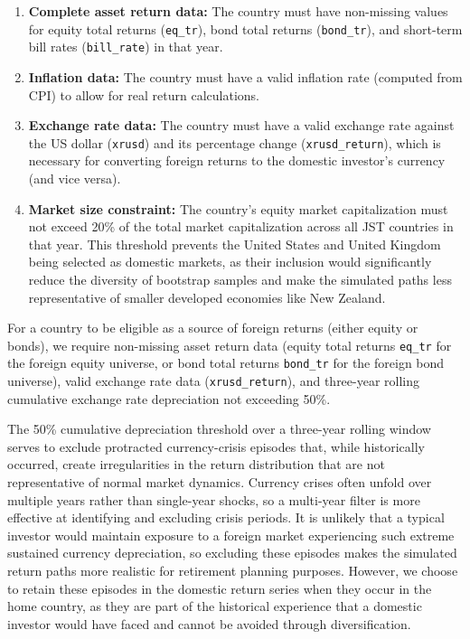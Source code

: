 \documentclass[11pt]{article}
\begin{document}
\begin{enumerate}
    \item \textbf{Complete asset return data:} The country must have non-missing values for equity total returns (\texttt{eq\_tr}), bond total returns (\texttt{bond\_tr}), and short-term bill rates (\texttt{bill\_rate}) in that year.
    
    \item \textbf{Inflation data:} The country must have a valid inflation rate (computed from CPI) to allow for real return calculations.
    
    \item \textbf{Exchange rate data:} The country must have a valid exchange rate against the US dollar (\texttt{xrusd}) and its percentage change (\texttt{xrusd\_return}), which is necessary for converting foreign returns to the domestic investor's currency (and vice versa).
    
    \item \textbf{Market size constraint:} The country's equity market capitalization must not exceed 20\% of the total market capitalization across all JST countries in that year. This threshold prevents the United States and United Kingdom being selected as domestic markets, as their inclusion would significantly reduce the diversity of bootstrap samples and make the simulated paths less representative of smaller developed economies like New Zealand.
\end{enumerate}

For a country to be eligible as a source of foreign returns (either equity or bonds), we require non-missing asset return data (equity total returns \texttt{eq\_tr} for the foreign equity universe, or bond total returns \texttt{bond\_tr} for the foreign bond universe), valid exchange rate data (\texttt{xrusd\_return}), and three-year rolling cumulative exchange rate depreciation not exceeding 50\%.

The 50\% cumulative depreciation threshold over a three-year rolling window serves to exclude protracted currency-crisis episodes that, while historically occurred, create irregularities in the return distribution that are not representative of normal market dynamics. Currency crises often unfold over multiple years rather than single-year shocks, so a multi-year filter is more effective at identifying and excluding crisis periods. It is unlikely that a typical investor would maintain exposure to a foreign market experiencing such extreme sustained currency depreciation, so excluding these episodes makes the simulated return paths more realistic for retirement planning purposes. However, we choose to retain these episodes in the domestic return series when they occur in the home country, as they are part of the historical experience that a domestic investor would have faced and cannot be avoided through diversification.
\end{document}
